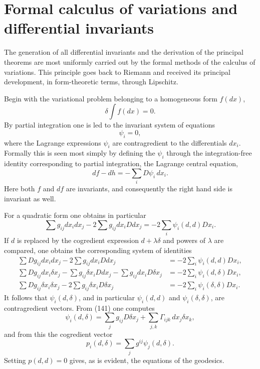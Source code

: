 \documentclass[11pt]{article}
\begin{document}
\newpage

\section{Formal calculus of variations and differential invariants}

The generation of all differential invariants and the derivation of the principal theorems are most uniformly carried out by the formal methods of the calculus of variations. This principle goes back to Riemann and received its principal development, in form-theoretic terms, through Lipschitz.

Begin with the variational problem belonging to a homogeneous form $f(dx)$,
\begin{equation}
  \delta \int f(dx)=0.                                            \tag{140}
\end{equation}
By partial integration one is led to the invariant system of equations
\[
  \psi_i=0,
\]
where the Lagrange expressions $\psi_i$ are contragredient to the differentials $dx_i$. Formally this is seen most simply by defining the $\psi_i$ through the integration-free identity corresponding to partial integration, the Lagrange central equation,
\[
  df-dh=-\sum_i D\psi_i\,dx_i.
\]
Here both $f$ and $df$ are invariants, and consequently the right hand side is invariant as well.

For a quadratic form one obtains in particular
\[
  \sum g_{ij}dx_i dx_j -2\sum g_{ij}dx_iDdx_j=-2\sum_i \psi_i(d,d)Dx_i.
\]
If $d$ is replaced by the cogredient expression $d+\lambda\delta$ and powers of $\lambda$ are compared, one obtains the corresponding system of identities
\begin{align*}
  \sum Dg_{ij}dx_i dx_j -2\sum g_{ij}dx_iDdx_j &=-2\sum_i\psi_i(d,d)Dx_i,\tag{141a}\\
  \sum Dg_{ij}dx_i\delta x_j-\sum g_{ij}\delta x_iDdx_j-\sum g_{ij}dx_iD\delta x_j &=-2\sum_i\psi_i(d,\delta)Dx_i,\tag{141b}\\
  \sum Dg_{ij}\delta x_i\delta x_j-2\sum g_{ij}\delta x_iD\delta x_j &=-2\sum_i\psi_i(\delta,\delta)Dx_i.\tag{141c}
\end{align*}
It follows that $\psi_i(d,\delta)$, and in particular $\psi_i(d,d)$ and $\psi_i(\delta,\delta)$, are contragredient vectors. From (141) one computes
\[
  \psi_i(d,\delta)=\sum_j g_{ij}D\delta x_j+\sum_{j,k}\Gamma_{ijk}\,dx_j\delta x_k,
\]
and from this the cogredient vector
\begin{equation}
  p_i(d,\delta)=\sum_j g^{ij}\psi_j(d,\delta).                   \tag{142}
\end{equation}
Setting $p(d,d)=0$ gives, as is evident, the equations of the geodesics.
\end{document}
